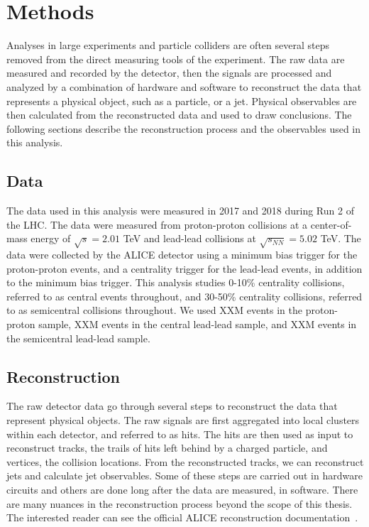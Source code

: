 \chapter{Methods} \label{ch:methods}

Analyses in large experiments and particle colliders are often several steps removed from the direct measuring tools of the experiment. The raw data are measured and recorded by the detector, then the signals are processed and analyzed by a combination of hardware and software to reconstruct the data that represents a physical object, such as a particle, or a jet. Physical observables are then calculated from the reconstructed data and used to draw conclusions. The following sections describe the reconstruction process and the observables used in this analysis.

\section{Data}

The data used in this analysis were measured in 2017 and 2018 during Run 2 of the LHC. The data were measured from proton-proton collisions at a center-of-mass energy of $\sqrt{s} = 2.01$ TeV and lead-lead collisions at $\sqrt{s_{NN}} = 5.02$ TeV. The data were collected by the ALICE detector using a minimum bias trigger for the proton-proton events, and a centrality trigger for the lead-lead events, in addition to the minimum bias trigger. This analysis studies 0-10\% centrality collisions, referred to as central events throughout, and 30-50\% centrality collisions, referred to as semicentral collisions throughout. We used XXM events in the proton-proton sample, XXM events in the central lead-lead sample, and XXM events in the semicentral lead-lead sample.

\section{Reconstruction}

The raw detector data go through several steps to reconstruct the data that represent physical objects. The raw signals are first aggregated into local clusters within each detector, and referred to as hits. The hits are then used as input to reconstruct tracks, the trails of hits left behind by a charged particle, and vertices, the collision locations. From the reconstructed tracks, we can reconstruct jets and calculate jet observables. Some of these steps are carried out in hardware circuits and others are done long after the data are measured, in software. There are many nuances in the reconstruction process beyond the scope of this thesis. The interested reader can see the official ALICE reconstruction documentation~\cite{ALICEreco}.

